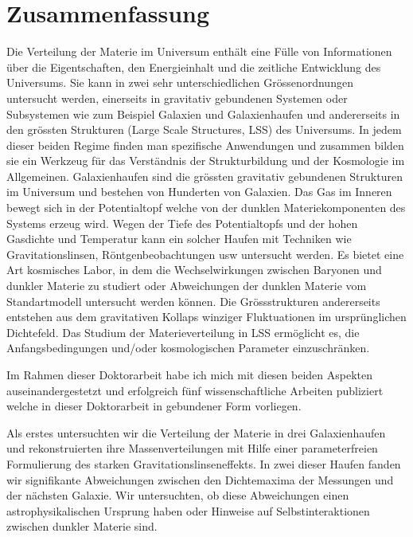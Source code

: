 {}

\chapter*{Zusammenfassung}%



Die Verteilung der Materie im Universum enth{\"a}lt eine F{\"u}lle von
Informationen {\"u}ber die Eigentschaften, den Energieinhalt und die zeitliche
Entwicklung des Universums. Sie kann in zwei sehr unterschiedlichen
Gr{\"o}ssenordnungen untersucht werden, einerseits in gravitativ gebundenen
Systemen oder Subsystemen wie zum Beispiel Galaxien und Galaxienhaufen und andererseits in
den gr{\"o}ssten  Strukturen (Large Scale Structures, LSS) des Universums.
In jedem dieser beiden Regime finden man spezifische Anwendungen und zusammen bilden sie ein Werkzeug f\"ur das Verst{\"a}ndnis der Strukturbildung und der Kosmologie im Allgemeinen.
Galaxienhaufen sind die gr{\"o}ssten gravitativ gebundenen Strukturen im
Universum und bestehen von Hunderten von Galaxien. Das Gas im Inneren bewegt
sich in der Potentialtopf welche von der dunklen Materiekomponenten des Systems
erzeug wird. Wegen der Tiefe des Potentialtopfs und der hohen Gasdichte und
Temperatur kann ein solcher Haufen mit Techniken wie Gravitationslinsen,
R{\"o}ntgenbeobachtungen usw untersucht werden.  Es bietet eine Art kosmisches
Labor, in dem die Wechselwirkungen zwischen Baryonen und dunkler Materie zu
studiert oder Abweichungen der dunklen Materie vom Standartmodell untersucht werden k\"onnen.
Die Gr{\"o}ssstrukturen andererseits entstehen aus dem gravitativen Kollaps winziger Fluktuationen im urspr{\"u}nglichen Dichtefeld. Das Studium der
Materieverteilung in LSS erm{\"o}glicht es, die Anfangsbedingungen und/oder
kosmologischen Parameter einzuschr{\"a}nken.


Im Rahmen dieser Doktorarbeit habe ich mich mit diesen beiden Aspekten
auseinandergestetzt und erfolgreich f{\"u}nf wissenschaftliche Arbeiten
publiziert welche in dieser Doktorarbeit in gebundener Form vorliegen.

Als erstes untersuchten wir die Verteilung der Materie in drei Galaxienhaufen
und rekonstruierten ihre Massenverteilungen mit Hilfe einer parameterfreien
Formulierung des starken Gravitationslinseneffekts. In zwei dieser Haufen fanden
wir signifikante Abweichungen zwischen den Dichtemaxima der Messungen und der
n{\"a}chsten Galaxie. Wir untersuchten, ob diese Abweichungen einen
astrophysikalischen Ursprung haben oder Hinweise auf Selbstinteraktionen
zwischen dunkler Materie sind.

